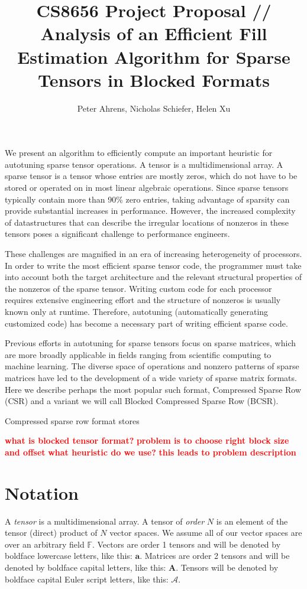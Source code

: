 \documentclass[12pt]{article}
\title{CS8656 Project Proposal // Analysis of an Efficient Fill Estimation Algorithm for Sparse Tensors in Blocked Formats}
\author{Peter Ahrens, Nicholas Schiefer, Helen Xu}
\date{}
\newcommand{\todo}[1] {\textbf{\textcolor{red}{#1}}}
\renewcommand{\vec}[1] {\mathbf{#1}}
\newcommand{\Mat}[1] {\mathbf{#1}}
\newcommand{\Ten}[1] {\mathbf{\mathcal{#1}}}
\newcommand{\F} {\mathbb{F}}
\begin{document}
  \maketitle

  We present an algorithm to efficiently compute an important heuristic for autotuning sparse tensor operations. A tensor is a multidimensional array. A sparse tensor is a tensor whose entries are mostly zeros, which do not have to be stored or operated on in most linear algebraic operations. Since sparse tensors typically contain more than 90\% zero entries, taking advantage of sparsity can provide substantial increases in performance. However, the increased complexity of datastructures that can describe the irregular locations of nonzeros in these tensors poses a significant challenge to performance engineers.

  These challenges are magnified in an era of increasing heterogeneity of processors. In order to write the most efficient sparse tensor code, the programmer must take into account both the target architecture and the relevant structural properties of the nonzeros of the sparse tensor. Writing custom code for each processor requires extensive engineering effort and the structure of nonzeros is usually known only at runtime. Therefore, autotuning (automatically generating customized code) has become a necessary part of writing efficient sparse code.

  Previous efforts in autotuning for sparse tensors focus on sparse matrices, which are more broadly applicable in fields ranging from scientific computing to machine learning. The diverse space of operations and nonzero patterns of sparse matrices have led to the development of a wide variety of sparse matrix formats. Here we describe perhaps the most popular such format, Compressed Sparse Row (CSR) and a variant we will call Blocked Compressed Sparse Row (BCSR).

  Compressed sparse row format stores

\todo{what is blocked tensor format?}
\todo{problem is to choose right block size and offset}
\todo{what heuristic do we use?}
\todo{this leads to problem description}

  \section{Notation}
    A \textit{tensor} is a multidimensional array. A tensor of \textit{order} $N$ is an element of the tensor (direct) product of $N$ vector spaces. We assume all of our vector spaces are over an arbitrary field $\F$. Vectors are order 1 tensors and will be denoted by boldface lowercase letters, like this: $\vec{a}$. Matrices are order 2 tensors and will be denoted by boldface capital letters, like this: $\Mat{A}$. Tensors will be denoted by boldface capital Euler script letters, like this: $\Ten{A}$.
\end{document}

